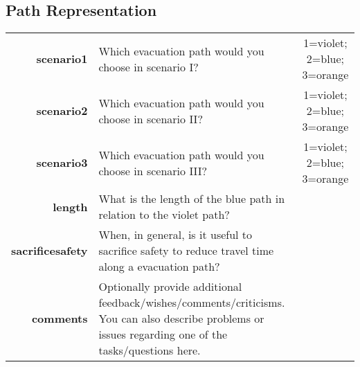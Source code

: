 \documentclass[8pt]{article}
\begin{document}
\newpage
%
%
%
%
\subsection*{Path Representation}

\begin{longtable}{r p{15cm} c}
\hline
\textbf{scenario1} & Which evacuation path would you choose in scenario I? & 1=violet; 2=blue; 3=orange\\
\textbf{scenario2} & Which evacuation path would you choose in scenario II? & 1=violet; 2=blue; 3=orange\\
\textbf{scenario3} & Which evacuation path would you choose in scenario III? & 1=violet; 2=blue; 3=orange\\
\textbf{length} & What is the length of the blue path in relation to the violet path? \\
\textbf{sacrificesafety} & When, in general, is it useful to sacrifice safety to reduce travel time along a evacuation path? \\
\textbf{comments} & Optionally provide additional feedback/wishes/comments/criticisms.
You can also describe problems or issues regarding one of the tasks/questions here. \\
\hline
\end{longtable}
 
\end{document}
